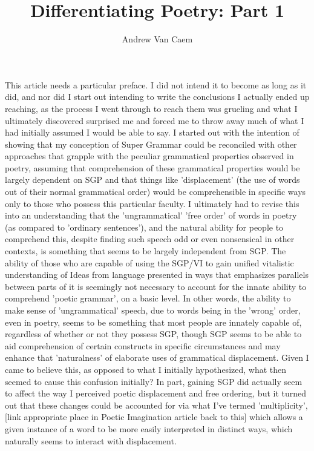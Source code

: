 \documentclass[]{article}
\title{Differentiating Poetry: Part 1}
\author{Andrew Van Caem}
\begin{document}
\maketitle

\section{}

This article needs a particular preface. I did not intend it to become as long as it did, and nor did I start out intending to write the conclusions I actually ended up reaching, as the process I went through to reach them was grueling and what I ultimately discovered surprised me and forced me to throw away much of what I had initially assumed I would be able to say. I started out with the intention of showing that my conception of Super Grammar could be reconciled with other approaches that grapple with the peculiar grammatical properties observed in poetry, assuming that comprehension of these grammatical properties would be largely dependent on SGP and that things like 'displacement' (the use of words out of their normal grammatical order) would be comprehensible in specific ways only to those who possess this particular faculty. I ultimately had to revise this into an understanding that the 'ungrammatical' 'free order' of words in poetry (as compared to 'ordinary sentences'), and the natural ability for people to comprehend this, despite finding such speech odd or even nonsensical in other contexts, is something that seems to be largely independent from SGP. The ability of those who are capable of using the SGP/VI to gain unified vitalistic understanding of Ideas from language presented in ways that emphasizes parallels between parts of it is seemingly not necessary to account for the innate ability to comprehend 'poetic grammar', on a basic level. In other words, the ability to make sense of 'ungrammatical' speech, due to words being in the 'wrong' order, even in poetry, seems to be something that most people are innately capable of, regardless of whether or not they possess SGP, though SGP seems to be able to aid comprehension of certain constructs in specific circumstances and may enhance that 'naturalness' of elaborate uses of grammatical displacement. Given I came to believe this, as opposed to what I initially hypothesized, what then seemed to cause this confusion initially? In part, gaining SGP did actually seem to affect the way I perceived poetic displacement and free ordering, but it turned out that these changes could be accounted for via what I've termed 'multiplicity', [link appropriate place in Poetic Imagination article back to this] which allows a given instance of a word to be more easily interpreted in distinct ways, which naturally seems to interact with displacement.\\
\end{document}
